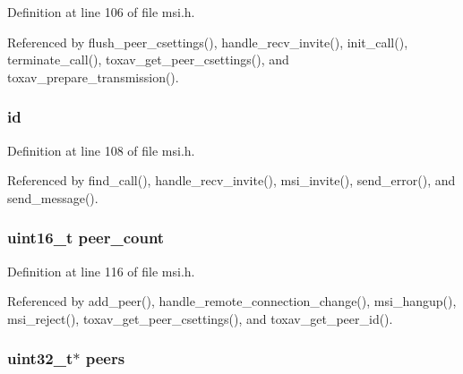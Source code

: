 Definition at line 106 of file msi.\+h.



Referenced by flush\+\_\+peer\+\_\+csettings(), handle\+\_\+recv\+\_\+invite(), init\+\_\+call(), terminate\+\_\+call(), toxav\+\_\+get\+\_\+peer\+\_\+csettings(), and toxav\+\_\+prepare\+\_\+transmission().

\hypertarget{struct___m_s_i_call_aa135fbffd11268758f5f21269fb46853}{
\subsubsection[{id}]{ id}}\label{struct___m_s_i_call_aa135fbffd11268758f5f21269fb46853}


Definition at line 108 of file msi.\+h.



Referenced by find\+\_\+call(), handle\+\_\+recv\+\_\+invite(), msi\+\_\+invite(), send\+\_\+error(), and send\+\_\+message().

\hypertarget{struct___m_s_i_call_a62e9da1e57f84fd224590c4d466724aa}{
\subsubsection[{peer\+\_\+count}]{\setlength{\rightskip}{0pt plus 5cm}uint16\+\_\+t peer\+\_\+count}}\label{struct___m_s_i_call_a62e9da1e57f84fd224590c4d466724aa}


Definition at line 116 of file msi.\+h.



Referenced by add\+\_\+peer(), handle\+\_\+remote\+\_\+connection\+\_\+change(), msi\+\_\+hangup(), msi\+\_\+reject(), toxav\+\_\+get\+\_\+peer\+\_\+csettings(), and toxav\+\_\+get\+\_\+peer\+\_\+id().

\hypertarget{struct___m_s_i_call_a55d2568491d616f7fef07bc7137c8c23}{
\subsubsection[{peers}]{\setlength{\rightskip}{0pt plus 5cm}uint32\+\_\+t$\ast$ peers}}\label{struct___m_s_i_call_a55d2568491d616f7fef07bc7137c8c23}


